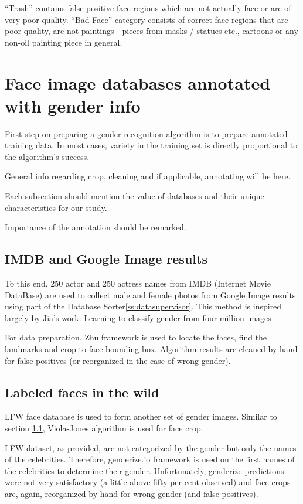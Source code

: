 \documentclass[runningheads]{llncs}
\begin{document}
“Trash” contains false positive face regions which are not actually face or are of very poor quality. “Bad Face” category consists of correct face regions that are poor quality, are not paintings - pieces from masks / statues etc., cartoons or any non-oil painting piece in general.


\section{Face image databases annotated with gender info}
First step on preparing a gender recognition algorithm is to prepare annotated training data. In most cases, variety in the training set is directly proportional to the algorithm's success. 

General info regarding crop, cleaning and if applicable, annotating will be here.

Each subsection should mention the value of databases and their unique characteristics for our study.

Importance of the annotation\cite{mathias2014face} should be remarked.


\subsection{IMDB and Google Image results}\label{ss-dbGenderGoogleImages}

To this end, 250 actor and 250 actress names from IMDB (Internet Movie DataBase) are used to collect male and female photos from Google Image results using part of the Database Sorter\ref{ss:datasupervisor}. This method is inspired largely by Jia's work: Learning to classify gender from four million images
\cite{jia2015learning}.

For data preparation, Zhu framework\cite{zhu2012face} is used to locate the faces, find the landmarks and crop to face bounding box. Algorithm results are cleaned by hand for false positives (or reorganized in the case of wrong gender).

\subsection{Labeled faces in the wild}\label{ss-dbLFW}
LFW\cite{LFWTech} face database is used to form another set of gender images. Similar to section \ref{ss-dbGenderGoogleImages}, Viola-Jones algorithm is used for face crop.

LFW dataset, as provided, are not categorized by the gender but only the names of the celebrities. Therefore, genderize.io framework is used on the first names of the celebrities to determine their gender. Unfortunately, genderize predictions were not very satisfactory (a little above fifty per cent observed) and face crops are, again, reorganized by hand for wrong gender (and false positives).
\end{document}
